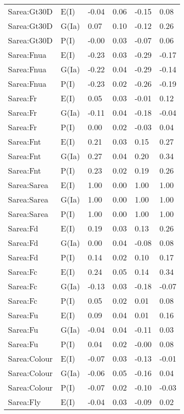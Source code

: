 \begin{center}
\begin{longtable}{|p{1.1in}|p{0.7in}|p{0.7in}|p{0.6in}|p{0.6in}|p{0.6in}|}
  Sarea:Gt30D & E(I) & -0.04 & 0.06 & -0.15 & 0.08 \\ 
  Sarea:Gt30D & G(Ia) & 0.07 & 0.10 & -0.12 & 0.26 \\ 
  Sarea:Gt30D & P(I) & -0.00 & 0.03 & -0.07 & 0.06 \\ 
  Sarea:Fnua & E(I) & -0.23 & 0.03 & -0.29 & -0.17 \\ 
  Sarea:Fnua & G(Ia) & -0.22 & 0.04 & -0.29 & -0.14 \\ 
  Sarea:Fnua & P(I) & -0.23 & 0.02 & -0.26 & -0.19 \\ 
  Sarea:Fr & E(I) & 0.05 & 0.03 & -0.01 & 0.12 \\ 
  Sarea:Fr & G(Ia) & -0.11 & 0.04 & -0.18 & -0.04 \\ 
  Sarea:Fr & P(I) & 0.00 & 0.02 & -0.03 & 0.04 \\ 
  Sarea:Fnt & E(I) & 0.21 & 0.03 & 0.15 & 0.27 \\ 
  Sarea:Fnt & G(Ia) & 0.27 & 0.04 & 0.20 & 0.34 \\ 
  Sarea:Fnt & P(I) & 0.23 & 0.02 & 0.19 & 0.26 \\ 
  Sarea:Sarea & E(I) & 1.00 & 0.00 & 1.00 & 1.00 \\ 
  Sarea:Sarea & G(Ia) & 1.00 & 0.00 & 1.00 & 1.00 \\ 
  Sarea:Sarea & P(I) & 1.00 & 0.00 & 1.00 & 1.00 \\ 
  Sarea:Fd & E(I) & 0.19 & 0.03 & 0.13 & 0.26 \\ 
  Sarea:Fd & G(Ia) & 0.00 & 0.04 & -0.08 & 0.08 \\ 
  Sarea:Fd & P(I) & 0.14 & 0.02 & 0.10 & 0.17 \\ 
  Sarea:Fc & E(I) & 0.24 & 0.05 & 0.14 & 0.34 \\ 
  Sarea:Fc & G(Ia) & -0.13 & 0.03 & -0.18 & -0.07 \\ 
  Sarea:Fc & P(I) & 0.05 & 0.02 & 0.01 & 0.08 \\ 
  Sarea:Fu & E(I) & 0.09 & 0.04 & 0.01 & 0.16 \\ 
  Sarea:Fu & G(Ia) & -0.04 & 0.04 & -0.11 & 0.03 \\ 
  Sarea:Fu & P(I) & 0.04 & 0.02 & -0.00 & 0.08 \\ 
  Sarea:Colour & E(I) & -0.07 & 0.03 & -0.13 & -0.01 \\ 
  Sarea:Colour & G(Ia) & -0.06 & 0.05 & -0.16 & 0.04 \\ 
  Sarea:Colour & P(I) & -0.07 & 0.02 & -0.10 & -0.03 \\ 
  Sarea:Fly & E(I) & -0.04 & 0.03 & -0.09 & 0.02 \\ 

\end{longtable}
\end{center}
